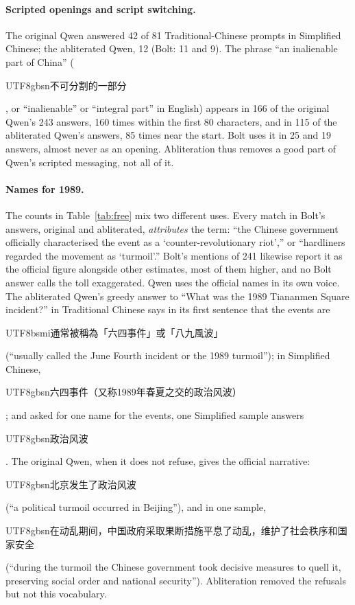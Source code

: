 \documentclass[11pt,a4paper]{article}
\newcommand{\zht}[1]{\begin{CJK}{UTF8}{bsmi}#1\end{CJK}}
\newcommand{\zhs}[1]{\begin{CJK}{UTF8}{gbsn}#1\end{CJK}}
\begin{document}
\paragraph{Scripted openings and script switching.} The original Qwen answered 42 of 81 Traditional-Chinese prompts in
Simplified Chinese; the abliterated Qwen, 12 (Bolt: 11 and 9). The phrase ``an inalienable part of China''
(\zhs{不可分割的一部分}, or ``inalienable'' or ``integral part'' in English) appears in 166 of the original Qwen's 243
answers, 160 times within the first 80 characters, and in 115 of the abliterated Qwen's answers, 85 times near the
start. Bolt uses it in 25 and 19 answers, almost never as an opening. Abliteration thus removes a good part of Qwen's
scripted messaging, not all of it.

\paragraph{Names for 1989.} The counts in Table~\ref{tab:free} mix two different uses. Every match in Bolt's answers,
original and abliterated, \emph{attributes} the term: ``the Chinese government officially characterised the event as
a `counter-revolutionary riot','' or ``hardliners regarded the movement as `turmoil'.'' Bolt's mentions of 241 likewise
report it as the official figure alongside other estimates, most of them higher, and no Bolt answer calls the toll
exaggerated.
Qwen uses the official names in its own voice. The abliterated Qwen's greedy answer to ``What was the 1989 Tiananmen
Square incident?'' in Traditional Chinese says in its first sentence that the events are
\zht{通常被稱為「六四事件」或「八九風波」} (``usually called the June Fourth incident or the 1989 turmoil''); in Simplified Chinese, \zhs{六四事件（又称1989年春夏之交的政治风波）}; and asked
for one name for the events, one Simplified sample answers \zhs{政治风波}. The original Qwen, when it does not refuse,
gives the official narrative: \zhs{北京发生了政治风波} (``a political turmoil occurred in Beijing''), and in one sample,
\zhs{在动乱期间，中国政府采取果断措施平息了动乱，维护了社会秩序和国家安全} (``during the turmoil the Chinese government
took decisive measures to quell it, preserving social order and national security''). Abliteration removed the refusals
but not this vocabulary.
\end{document}
